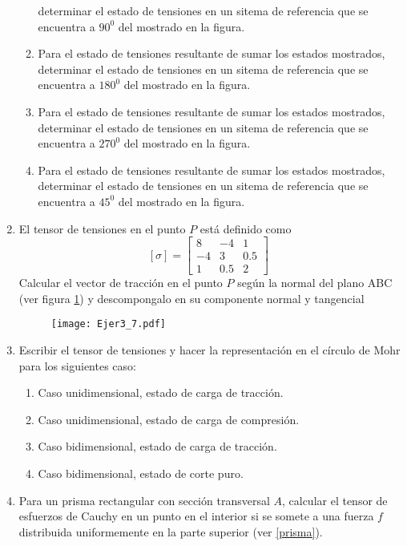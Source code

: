 \documentclass[../notas medios.tex]{subfiles}
\begin{document}
\begin{enumerate}
\begin{enumerate}
determinar el estado de tensiones en un sitema de referencia que se encuentra a $90^0$ del mostrado en la figura.
	\item Para el estado de tensiones resultante de sumar los estados mostrados,
determinar el estado de tensiones en un sitema de referencia que se encuentra a $180^0$ del mostrado en la figura.
	\item Para el estado de tensiones resultante de sumar los estados mostrados,
determinar el estado de tensiones en un sitema de referencia que se encuentra a $270^0$ del mostrado en la figura.
	\item Para el estado de tensiones resultante de sumar los estados mostrados,
determinar el estado de tensiones en un sitema de referencia que se encuentra a $45^0$ del mostrado en la figura.
\end{enumerate}
%
\item \label{punto07} El tensor de tensiones en el punto $P$ est\'a definido
como
%	
		\[{[\sigma]} = \left[ \begin{array}{ccc}
		8 & -4 & 1 \\ 
		-4 & 3 & 0.5 \\ 
		1 & 0.5 & 2
		\end{array}  \right] \enspace\]
Calcular el vector de tracci\'on en el punto $P$ seg\'un la normal del plano ABC
(ver figura \cref{norplano}) y descompongalo en su componente normal y tangencial
%
\begin{figure}[H]
	\centering
	\texttt{[image: Ejer3\_7.pdf]}
	\caption{}
	\label{norplano}
\end{figure}
\item \label{punto08} Escribir el tensor de tensiones y hacer la
representaci\'on en el c\'irculo de Mohr para los siguientes caso:
%
\begin{enumerate}
	\item Caso unidimensional, estado de carga de tracci\'on.
	\item Caso unidimensional, estado de carga de compresi\'on.
	\item Caso bidimensional, estado de carga de tracci\'on.
	\item Caso bidimensional, estado de corte puro.
\end{enumerate}
\item \label{punto09} Para un prisma rectangular con secci\'on transversal $A$,
calcular el tensor de esfuerzos de Cauchy en un punto en el interior si se somete a una fuerza $f$ distribuida uniformemente en la parte superior (ver \cref{prisma}). 

\end{enumerate}
\end{document}
